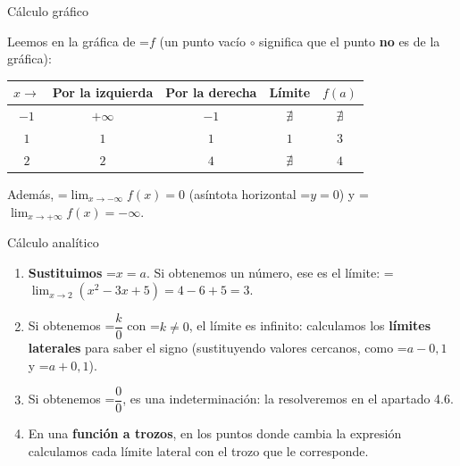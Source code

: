\documentclass[11pt,a4paper]{article}
\newcommand{\fmm}[1]{\setbox0=\hbox{$#1$}\ifdim\wd0>\linewidth\[#1\]\else\mbox{\box0}\fi}
\begin{document}
  
\begin{fmex}{Cálculo gráfico}
\begin{center}\end{center}

      

Leemos en la gráfica de \fmm{f} (un punto vacío $\circ$ significa que el punto \textbf{no} es de la gráfica):

      
\begin{center}\renewcommand{\arraystretch}{1.5}\begin{tabular}{ccccc}\toprule
\textbf{$x\to$} & \textbf{Por la izquierda} & \textbf{Por la derecha} & \textbf{Límite} & \textbf{$f(a)$}\\\midrule
$-1$ & $+\infty$ & $-1$ & $\nexists$ & $\nexists$\\
$1$ & $1$ & $1$ & $1$ & $3$\\
$2$ & $2$ & $4$ & $\nexists$ & $4$\\
\bottomrule\end{tabular}\end{center}

      

Además, \fmm{\displaystyle\lim_{x\to-\infty}f(x)=0} (asíntota horizontal \fmm{y=0}) y \fmm{\displaystyle\lim_{x\to+\infty}f(x)=-\infty}.
\end{fmex}

  
\begin{fmdef}{Cálculo analítico}
\begin{enumerate}
\item \textbf{Sustituimos} \fmm{x=a}. Si obtenemos un número, ese es el límite: \fmm{\displaystyle\lim_{x\to2}\left(x^2-3x+5\right)=4-6+5=3}.
\item Si obtenemos \fmm{\dfrac{k}{0}} con \fmm{k\neq0}, el límite es infinito: calculamos los \textbf{límites laterales} para saber el signo (sustituyendo valores cercanos, como \fmm{a-0{,}1} y \fmm{a+0{,}1}).
\item Si obtenemos \fmm{\dfrac00}, es una indeterminación: la resolveremos en el apartado 4.6.
\item En una \textbf{función a trozos}, en los puntos donde cambia la expresión calculamos cada límite lateral con el trozo que le corresponde.
\end{enumerate}
\end{fmdef}
\end{document}
